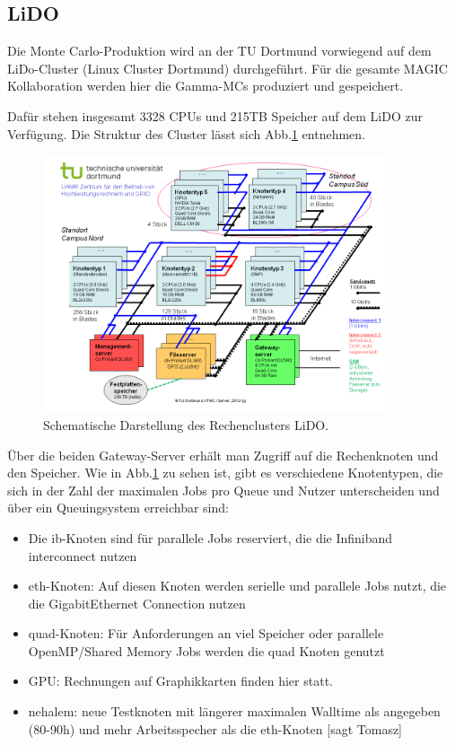 \subsection{LiDO}
Die Monte Carlo-Produktion wird an der TU Dortmund vorwiegend auf dem LiDo-Cluster (Linux Cluster Dortmund) durchgeführt. 
Für die gesamte MAGIC Kollaboration werden hier die Gamma-MCs produziert und gespeichert.

Dafür stehen insgesamt 3328 CPUs und 215TB Speicher auf dem LiDO zur Verfügung.
Die Struktur des Cluster lässt sich Abb.\ref{LiDo} entnehmen.

\begin{figure}[!h]
    \centering
    \includegraphics[width=0.9\textwidth]{./Plots/LiDO.png}
    \caption{Schematische Darstellung des Rechenclusters LiDO.}
    \label{LiDo}
\end{figure}


Über die beiden Gateway-Server erhält man Zugriff auf die Rechenknoten und den Speicher.
Wie in Abb.\ref{LiDo} zu sehen ist, gibt es verschiedene Knotentypen, die sich in der Zahl der maximalen Jobs pro Queue und Nutzer unterscheiden und über ein Queuingsystem erreichbar sind:

\begin{itemize}
 \item Die ib-Knoten sind für parallele Jobs reserviert, die die Infiniband interconnect nutzen
 \item eth-Knoten: Auf diesen Knoten werden serielle und parallele Jobs nutzt, die die GigabitEthernet Connection nutzen
 \item quad-Knoten: Für Anforderungen an viel Speicher oder parallele OpenMP/Shared Memory Jobs werden die quad Knoten genutzt
 \item GPU: Rechnungen auf Graphikkarten finden hier statt.
 \item nehalem: neue Testknoten mit längerer maximalen Walltime  als angegeben (80-90h) und mehr Arbeitsspecher als die eth-Knoten [sagt Tomasz]
\end{itemize}

